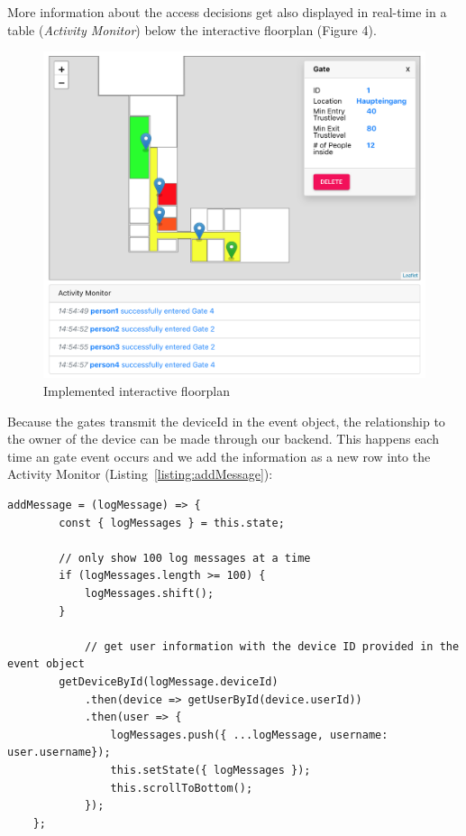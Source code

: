 More information about the access decisions get also displayed in real-time in a table (\emph{Activity Monitor}) below the interactive floorplan (Figure 4).

\begin{figure}[!hb]
	\centering
	\includegraphics[width=0.9\linewidth]{images/FloorplanScreenshot}
	\caption{Implemented interactive floorplan}
	\label{fig:FloorplanScreenshot}
\end{figure}

Because the gates transmit the deviceId in the event object, the relationship to the owner of the device can be made through our backend. This happens each time an gate event occurs and we add the information as a new row into the Activity Monitor (Listing~\ref{listing:addMessage}):

\begin{lstlisting}[label={listing:addMessage},caption={Function for adding message to Activity Monitor}]
addMessage = (logMessage) => {
        const { logMessages } = this.state;
        
        // only show 100 log messages at a time
        if (logMessages.length >= 100) {
            logMessages.shift();
        }

			// get user information with the device ID provided in the event object
        getDeviceById(logMessage.deviceId)
            .then(device => getUserById(device.userId))
            .then(user => {
                logMessages.push({ ...logMessage, username: user.username});
                this.setState({ logMessages });
                this.scrollToBottom();
            });
    };
\end{lstlisting}

